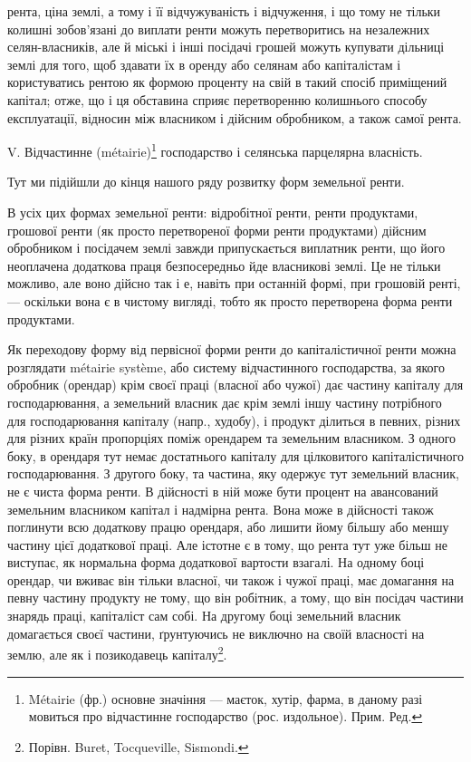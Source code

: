\parcont{}  %
рента, ціна землі, а тому і її відчужуваність і відчуження, і що тому не тільки
колишні зобов’язані до виплати ренти можуть перетворитись на незалежних
селян-власників, але й міські і інші посідачі грошей можуть купувати дільниці
землі для того, щоб здавати їх в оренду або селянам або капіталістам
і користуватись рентою як формою проценту на свій в такий спосіб приміщений
капітал; отже, що і ця обставина сприяє перетворенню колишнього способу
експлуатації, відносин між власником і дійсним обробником, а також самої рента.

V. Відчастинне (métairie)\footnote*{
Métairie (фр.) основне значіння — маєток, хутір, фарма, в даному разі мовиться про відчастинне
господарство (рос. издольное). Прим. Ред.
} господарство і селянська парцелярна
власність.

Тут ми підійшли до кінця нашого ряду розвитку форм земельної ренти.

В усіх цих формах земельної ренти: відробітної ренти, ренти продуктами,
грошової ренти (як просто перетвореної форми ренти продуктами) дійсним
обробником і посідачем землі завжди припускається виплатник ренти, що його
неоплачена додаткова праця безпосередньо йде власникові землі. Це не тільки
можливо, але воно дійсно так і е, навіть при останній формі, при грошовій
ренті, — оскільки вона є в чистому вигляді, тобто як просто перетворена форма
ренти продуктами.

Як переходову форму від первісної форми ренти до капіталістичної ренти
можна розглядати métairie système, або систему відчастинного господарства, за якого
обробник (орендар) крім своєї праці (власної або чужої) дає частину капіталу
для господарювання, а земельний власник дає крім землі іншу частину потрібного
для господарювання капіталу (напр., худобу), і продукт ділиться в певних,
різних для різних країн пропорціях поміж орендарем та земельним власником.
З одного боку, в орендаря тут немає достатнього капіталу для цілковитого капіталістичного
господарювання. З другого боку, та частина, яку одержує тут
земельний власник, не є чиста форма ренти. В дійсності в ній може бути процент
на авансований земельним власником капітал і надмірна рента. Вона може
в дійсності також поглинути всю додаткову працю орендаря, або лишити йому
більшу або меншу частину цієї додаткової праці. Але істотне є в тому, що
рента тут уже більш не виступає, як нормальна форма додаткової вартости взагалі.
На одному боці орендар, чи вживає він тільки власної, чи також і чужої праці,
має домагання на певну частину продукту не тому, що він робітник, а тому,
що він посідач частини знарядь праці, капіталіст сам собі. На другому боці
земельний власник домагається своєї частини, ґрунтуючись не виключно на
своїй власності на землю, але як і позикодавець капіталу\footnote{
Порівн. Buret, Tocqueville, Sismondi.
}.


